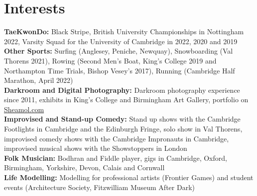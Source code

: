 \documentclass{article}
\begin{document}
\section*{Interests}
\textbf{TaeKwonDo:} Black Stripe, British University Championships in Nottingham 2022, Varsity Squad for the University of Cambridge in 2022, 2020 and 2019\\
\textbf{Other Sports:} Surfing (Anglesey, Peniche, Newquay),
Snowboarding (Val Thorens 2021), 
Rowing (Second Men's Boat, King's College 2019 and Northampton Time Trials, Bishop Vesey's 2017), Running (Cambridge Half Marathon, April 2022)\\
\textbf{Darkroom and Digital Photography:} Darkroom photography experience since 2011,  exhibits in King's College and Birmingham Art Gallery, portfolio on \href{www.sheamol.com}{Sheamol.com}\\
\textbf{Improvised and Stand-up Comedy:} Stand up shows with the Cambridge Footlights in Cambridge and the Edinburgh Fringe, solo show in Val Thorens, improvised comedy shows with the Cambridge Impronauts in Cambridge, improvised musical shows with the Showstoppers in London \\
\textbf{Folk Musician:} Bodhran and Fiddle%
player, gigs in Cambridge, Oxford, Birmingham, Yorkshire, Devon, Calais and Cornwall\\
\textbf{Life Modelling:} Modelling for professional artists (Frontier Games) and student events (Architecture Society, Fitzwilliam Museum After Dark)

\medskip
\vspace{-.75\baselineskip}
\hrulefill
\vspace{-.75\baselineskip}
\end{document}
